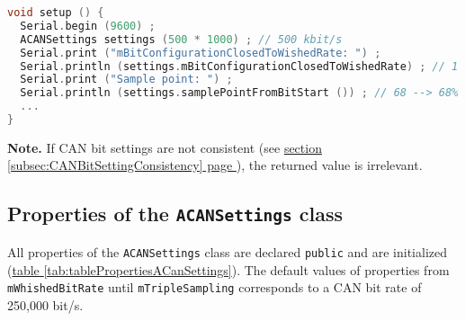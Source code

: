 \documentclass[9pt, a4paper, obeyspaces, openany]{extarticle}
\newcommand \subsectionLabel[2]{\subsection{#1}\label{subsec:#2}}
\newcommand\refSubsectionPage[1]{\hyperref[subsec:#1]{section \ref*{subsec:#1} page \pageref{subsec:#1}}}
\newcommand\refTableau[1]{\hyperref[tab:#1]{table \ref*{tab:#1}}}
\begin{document}
{ \small\begin{lstlisting}[language=c++]
void setup () {
  Serial.begin (9600) ;
  ACANSettings settings (500 * 1000) ; // 500 kbit/s
  Serial.print ("mBitConfigurationClosedToWishedRate: ") ;
  Serial.println (settings.mBitConfigurationClosedToWishedRate) ; // 1 (--> is true)
  Serial.print ("Sample point: ") ;
  Serial.println (settings.samplePointFromBitStart ()) ; // 68 --> 68%
  ...
}
\end{lstlisting}}

{\bf Note. } If CAN bit settings are not consistent (see \refSubsectionPage{CANBitSettingConsistency}), the returned value is irrelevant.






\subsectionLabel{Properties of the \texttt{ACANSettings} class}{propertiesACanSettings}

All properties of the \texttt{ACANSettings} class are declared \texttt{public} and are initialized (\refTableau{tablePropertiesACanSettings}). The default values of properties from \texttt{mWhishedBitRate} until \texttt{mTripleSampling} corresponds to a CAN bit rate of 250,000 bit/s.
\end{document}
